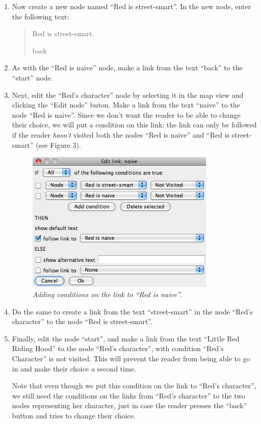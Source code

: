 \documentclass{article}
\begin{document}
\begin{enumerate}
\item Now create a new node named ``Red is street-smart''. In the new node,
enter the following text:

\begin{quotation}
Red is street-smart.

back
\end{quotation}

\item As with the ``Red is naive'' node, make a link from the text ``back'' to
the ``start'' node.
\item Next, edit the ``Red's character'' node by selecting it in the map
view and clicking the ``Edit node'' buton. Make a link from the text ``naive''
to the node ``Red is naive''. Since we don't want the reader to be able to
change their choice, we will put a condition on this link: the link can only be
followed if the reader \textit{hasn't} visited both the nodes ``Red is naive''
and ``Red is street-smart'' (see Figure 3).

\begin{figure}[h]
  \centering
  \includegraphics[width=9cm]{images/hypedyn-tutorial-2-figure-3}
  \caption{\textit{Adding conditions on the link to ``Red is naive''.}}
\end{figure} 

\item Do the same to create a link from the text ``street-smart'' in the node
``Red's character'' to the node ``Red is street-smart''.
\item Finally, edit the node ``start'', and make a link from the text ``Little
Red Riding Hood'' to the node ``Red's character'', with condition ``Red's
Character'' is not visited. This will prevent the reader from being able to go
in and make their choice a second time.

Note that even though we put this condition on the link to ``Red's character'',
we still need the conditions on the links from ``Red's character'' to the two
nodes representing her character, just in case the reader presses the ``back''
button and tries to change their choice.
\end{enumerate}
\end{document}

